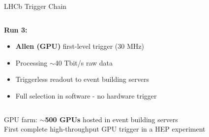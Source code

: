 \documentclass[10pt,aspectratio=169]{beamer}
\begin{document}
\begin{frame}{LHCb Trigger Chain}
  \begin{columns}[T]
    \begin{column}{0.6\textwidth}
      \textbf{Run 3: }
      \begin{itemize}
        \item \textbf{Allen (GPU)} first-level trigger (30 MHz)
        \item Processing $\sim$40 Tbit/s raw data
        \item Triggerless readout to event building servers
        \item Full selection in software - no hardware trigger
      \end{itemize}
    \end{column}

    \begin{column}{0.4\textwidth}
      \begin{center}
      \end{center}
    \end{column}
  \end{columns}

  GPU farm: \textbf{$\sim$500 GPUs} hosted in event building servers\\
  First complete high-throughput GPU trigger in a HEP experiment
\end{frame}
\end{document}
